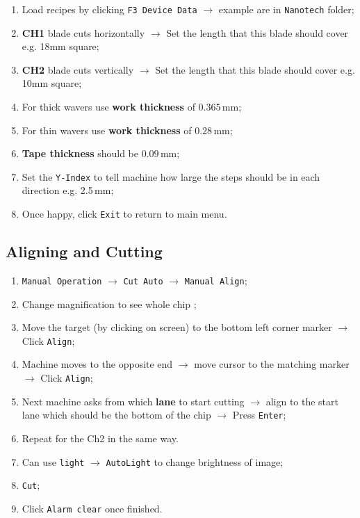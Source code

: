 \begin{enumerate}
	\item Load recipes by clicking \texttt{F3 Device Data} \(\rightarrow\) example are in
	      \texttt{Nanotech} folder;
	\item \textbf{CH1} blade cuts horizontally \(\rightarrow\) Set the length that this
	      blade should cover e.g. 18mm square;
	\item \textbf{CH2} blade cuts vertically \(\rightarrow\) Set the length that this blade
	      should cover e.g. 10mm square;
	\item For thick wavers use \textbf{work thickness} of $0.365\,\text{mm}$;
	\item For thin wavers use \textbf{work thickness} of $0.28\,\text{mm}$;
	\item \textbf{Tape thickness} should be $0.09\,\text{mm}$;
	\item Set the \texttt{Y-Index} to tell machine how large the steps should be
	      in each direction e.g. 2.5\,mm;
	\item Once happy, click \texttt{Exit} to return to main menu.
\end{enumerate}

\subsection{Aligning and Cutting}
\label{sec:cutting}

\begin{enumerate}
	\item \texttt{Manual Operation} \(\rightarrow\) \texttt{Cut Auto} \(\rightarrow\) \texttt{Manual
		      Align};
	\item Change magnification to see whole chip \textbf{};
	\item Move the target (by clicking on screen) to the bottom left corner marker
	      \(\rightarrow\) Click \texttt{Align};
	\item Machine moves to the opposite end \(\rightarrow\) move cursor to the matching
	      marker \(\rightarrow\) Click \texttt{Align};
	\item Next machine asks from which \textbf{lane} to start cutting \(\rightarrow\) align
	      to the start lane which should be the bottom of the chip \(\rightarrow\) Press
	      \texttt{Enter};
	\item Repeat for the Ch2 in the same way. 
	\item Can use \texttt{light} \(\rightarrow\) \texttt{AutoLight} to change brightness of
	      image;
	\item \texttt{Cut};
	\item Click \texttt{Alarm clear} once finished.
\end{enumerate}


